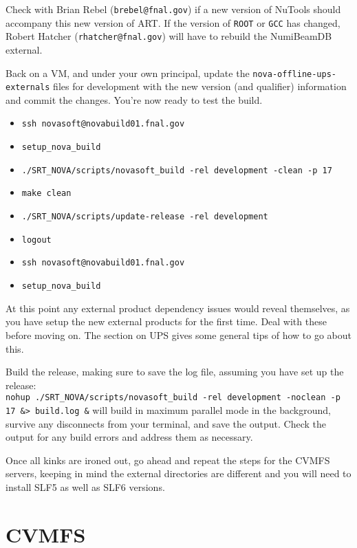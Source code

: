 \documentclass[letterpaper,10pt]{article}
\begin{document}
Check with Brian Rebel (\verb|brebel@fnal.gov|) if a new version of NuTools should accompany this new version of ART. If the version of \verb|ROOT| or \verb|GCC| has changed, Robert Hatcher (\verb|rhatcher@fnal.gov|) will have to rebuild the NumiBeamDB external.

Back on a VM, and under your own principal, update the \verb|nova-offline-ups-externals| files for development with the new version (and qualifier) information and commit the changes. You're now ready to test the build.
\begin{itemize}
\item \verb|ssh novasoft@novabuild01.fnal.gov|
\item \verb|setup_nova_build|
\item \verb|./SRT_NOVA/scripts/novasoft_build -rel development -clean -p 17|
\item \verb|make clean|
\item \verb|./SRT_NOVA/scripts/update-release -rel development|
\item \verb|logout|
\item \verb|ssh novasoft@novabuild01.fnal.gov|
\item \verb|setup_nova_build|
\end{itemize}

At this point any external product dependency issues would reveal themselves, as you have setup the new external products for the first time. Deal with these before moving on. The section on UPS gives some general tips of how to go about this.

Build the release, making sure to save the log file, assuming you have set up the release:\\
\verb|nohup ./SRT_NOVA/scripts/novasoft_build -rel development -noclean -p 17 &> build.log &|
will build in maximum parallel mode in the background, survive any disconnects from your terminal, and save the output. Check the output for any build errors and address them as necessary. 

Once all kinks are ironed out, go ahead and repeat the steps for the CVMFS servers, keeping in mind the external directories are different and you will need to install SLF5 as well as SLF6 versions.

\section{CVMFS}
\end{document}
